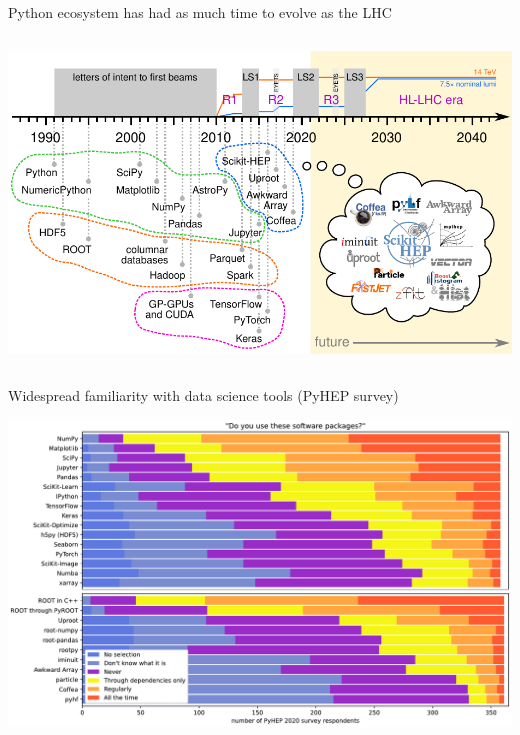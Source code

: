 \documentclass[aspectratio=169]{beamer}
\begin{document}
\begin{frame}{Python ecosystem has had as much time to evolve as the LHC}
\vspace{0.18 cm}
\begin{columns}
\includegraphics[width=\linewidth]{PLOTS/hllhc-python-timeline-5.pdf}
\end{columns}
\end{frame}

\begin{frame}{Widespread familiarity with data science tools (PyHEP survey)}
\vspace{0.25 cm}
\begin{center}
\includegraphics[width=0.88\linewidth]{PLOTS/lhlhc-familiarity-with-packages-paper.pdf}
\end{center}
\end{frame}
\end{document}
